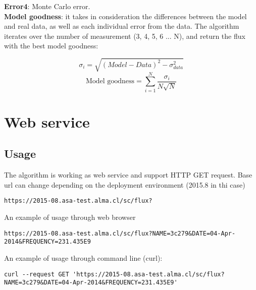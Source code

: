\documentclass[10pt]{article}
\begin{document}
\noindent \textbf{Error4}: Monte Carlo error. \\

\noindent \textbf{Model goodness}: it takes in consideration the differences
between the model and real data, as well as each individual error from the
data. The algorithm iterates over the number of measurement (3, 4, 5, 6 ... N),
and return the flux with the best model goodness:

$$ \sigma_i = \sqrt{ (Model - Data)^2 - \sigma_{data}^2 } $$
$$ \text{Model goodness} = \sum_{i=1}^{N}\frac{\sigma_i}{N\sqrt{N}} $$

\section{Web service}
\subsection{Usage}
The algorithm is working as web service and support HTTP GET request. Base url can change depending on the deployment environment (2015.8 in thi case)

\begingroup
\fontsize{8pt}{10pt}\selectfont
\begin{verbatim}
https://2015-08.asa-test.alma.cl/sc/flux?
\end{verbatim}
\endgroup

\noindent An example of usage through web browser
\begingroup
\fontsize{6pt}{10pt}\selectfont
\begin{verbatim}
https://2015-08.asa-test.alma.cl/sc/flux?NAME=3c279&DATE=04-Apr-2014&FREQUENCY=231.435E9
\end{verbatim}
\endgroup

\noindent An example of usage through command line (curl):
\begingroup
\fontsize{6pt}{10pt}\selectfont
\begin{verbatim}
curl --request GET 'https://2015-08.asa-test.alma.cl/sc/flux?NAME=3c279&DATE=04-Apr-2014&FREQUENCY=231.435E9'
\end{verbatim}
\endgroup
\end{document}
